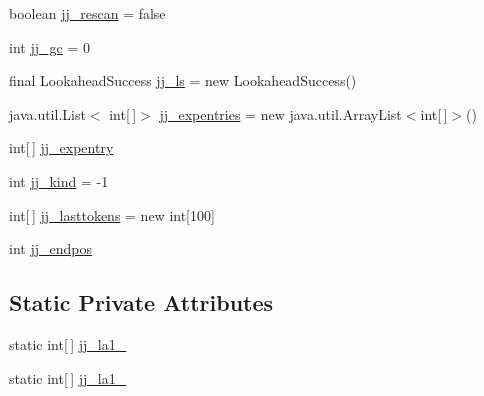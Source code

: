 \begin{DoxyCompactItemize}
\item 
boolean \hyperlink{classorg_1_1coode_1_1owl_1_1krssparser_1_1_k_r_s_s_parser_a9ee715147e8e7f798273e2d2ab6b308c}{jj\-\_\-rescan} = false
\item 
int \hyperlink{classorg_1_1coode_1_1owl_1_1krssparser_1_1_k_r_s_s_parser_ad388661d090f767f84f833eaf7ac8777}{jj\-\_\-gc} = 0
\item 
final Lookahead\-Success \hyperlink{classorg_1_1coode_1_1owl_1_1krssparser_1_1_k_r_s_s_parser_abe3a71bba8d1835fe24ca920a9213bc0}{jj\-\_\-ls} = new Lookahead\-Success()
\item 
java.\-util.\-List$<$ int\mbox{[}$\,$\mbox{]}$>$ \hyperlink{classorg_1_1coode_1_1owl_1_1krssparser_1_1_k_r_s_s_parser_a79d7adc25b237ab26d456017bbf1fc9d}{jj\-\_\-expentries} = new java.\-util.\-Array\-List$<$int\mbox{[}$\,$\mbox{]}$>$()
\item 
int\mbox{[}$\,$\mbox{]} \hyperlink{classorg_1_1coode_1_1owl_1_1krssparser_1_1_k_r_s_s_parser_a4c677878ec3234b580d2026aded39cf0}{jj\-\_\-expentry}
\item 
int \hyperlink{classorg_1_1coode_1_1owl_1_1krssparser_1_1_k_r_s_s_parser_aaddd38b8d1468545cbd55f1b8065dc35}{jj\-\_\-kind} = -\/1
\item 
int\mbox{[}$\,$\mbox{]} \hyperlink{classorg_1_1coode_1_1owl_1_1krssparser_1_1_k_r_s_s_parser_a0f2e7942f477fabea53b1d64f4690d1b}{jj\-\_\-lasttokens} = new int\mbox{[}100\mbox{]}
\item 
int \hyperlink{classorg_1_1coode_1_1owl_1_1krssparser_1_1_k_r_s_s_parser_af8b19099e80b1f82e5be4178a0b190ad}{jj\-\_\-endpos}
\end{DoxyCompactItemize}
\subsection*{Static Private Attributes}
\begin{DoxyCompactItemize}
\item 
static int\mbox{[}$\,$\mbox{]} \hyperlink{classorg_1_1coode_1_1owl_1_1krssparser_1_1_k_r_s_s_parser_af73b551ad2c9014162309d8a913d1653}{jj\-\_\-la1\-\_}
\item 
static int\mbox{[}$\,$\mbox{]} \hyperlink{classorg_1_1coode_1_1owl_1_1krssparser_1_1_k_r_s_s_parser_a48889f49415f0f0c8d0731ca0f222571}{jj\-\_\-la1\-\_}
\end{DoxyCompactItemize}


